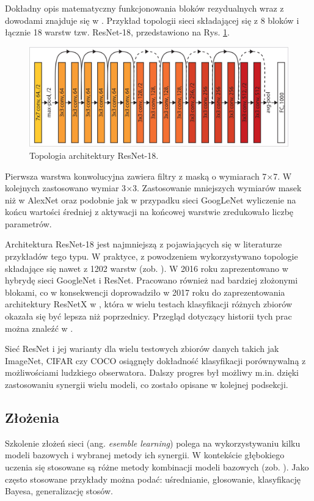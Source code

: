 Dokładny opis matematyczny funkcjonowania bloków rezydualnych wraz z dowodami znajduje się w \cite{DBLP:journals/corr/HeZR016}. Przykład topologii sieci składającej się z 8 bloków i łącznie 18 warstw tzw. ResNet-18, przedstawiono na Rys. \ref{ResNetTopo}.
\begin{figure}[h!]
	\centering
	\includegraphics[width=1\textwidth]{figures/ResNet.jpg}
	\caption{Topologia architektury ResNet-18.}
	\label{ResNetTopo}
\end{figure} 

Pierwsza warstwa konwolucyjna zawiera filtry z maską o wymiarach 7$\times$7. W kolejnych zastosowano wymiar 3$\times$3. Zastosowanie mniejszych wymiarów masek niż w AlexNet oraz podobnie jak w przypadku sieci GoogLeNet wyliczenie na końcu wartości średniej z aktywacji na końcowej warstwie zredukowało liczbę parametrów.

Architektura ResNet-18 jest najmniejszą z pojawiających się w literaturze przykładów tego typu. W praktyce, z powodzeniem wykorzystywano topologie składające się nawet z 1202 warstw (zob. \cite{ResNet}). W 2016 roku zaprezentowano w \cite{InceptionResNet} hybrydę sieci GoogleNet i ResNet. Pracowano również nad bardziej złożonymi blokami, co w konsekwencji doprowadziło w 2017 roku do zaprezentowania architektury ResNetX w \cite{ResNetX}, która w wielu testach klasyfikacji różnych zbiorów okazała się być lepsza niż poprzednicy. Przegląd dotyczący historii tych prac można znaleźć w \cite{ResNetXoverview}.

Sieć ResNet i jej warianty dla wielu testowych zbiorów danych takich jak ImageNet, CIFAR czy COCO \cite{COCO} osiągnęły dokładność klasyfikacji porównywalną z możliwościami ludzkiego obserwatora. Dalszy progres był możliwy m.in. dzięki zastosowaniu synergii wielu modeli, co zostało opisane w kolejnej podsekcji.

\subsection{Złożenia}
Szkolenie złożeń sieci (ang. \textit{esemble learning}) polega na wykorzystywaniu kilku modeli bazowych i wybranej metody ich synergii. W kontekście głębokiego uczenia się stosowane są różne metody kombinacji modeli bazowych (zob. \cite{Ensemble}). Jako często stosowane przykłady można podać: uśrednianie, głosowanie, klasyfikację Bayesa, generalizację stosów.

